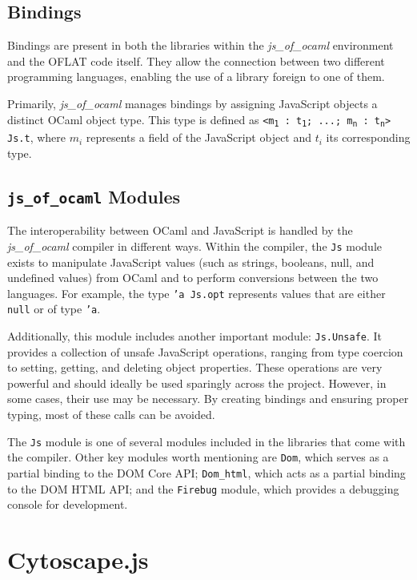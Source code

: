 \subsection{Bindings}
\label{ssec:bindings}

Bindings are present in both the libraries within the \textit{js\_of\_ocaml} environment and the OFLAT code itself. They allow the 
connection between two different programming languages, enabling the use of a library foreign to one of them.  

Primarily, \textit{js\_of\_ocaml} manages bindings by assigning JavaScript objects a distinct OCaml object type. This type is defined 
as \texttt{<m\textsubscript{1} : t\textsubscript{1}; ...; m\textsubscript{n} : t\textsubscript{n}> Js.t}, where $m_i$ represents a 
field of the JavaScript object and $t_i$ its corresponding type.


\subsection{\texttt{js\_of\_ocaml} Modules}
\label{ssec:js_of_ocaml_modules}

The interoperability between OCaml and JavaScript is handled by the \textit{js\_of\_ocaml} compiler in different ways. 
Within the compiler, the \texttt{Js} module exists to manipulate JavaScript values (such as strings, booleans, null, and undefined values) 
from OCaml and to perform conversions between the two languages. For example, the type \texttt{'a Js.opt} represents values that are 
either \texttt{null} or of type \texttt{'a}.  

Additionally, this module includes another important module: \texttt{Js.Unsafe}. It provides a collection of unsafe JavaScript operations, 
ranging from type coercion to setting, getting, and deleting object properties. These operations are very powerful and should ideally be 
used sparingly across the project. However, in some cases, their use may be necessary. By creating bindings and ensuring proper typing, 
most of these calls can be avoided.  

The \texttt{Js} module is one of several modules included in the libraries that come with the compiler. Other key modules worth mentioning 
are \texttt{Dom}, which serves as a partial binding to the DOM Core API; \texttt{Dom\_html}, which acts as a partial binding to the DOM 
HTML API; and the \texttt{Firebug} module, which provides a debugging console for development.


\section{Cytoscape.js}
\label{sec:Cytoscape}

